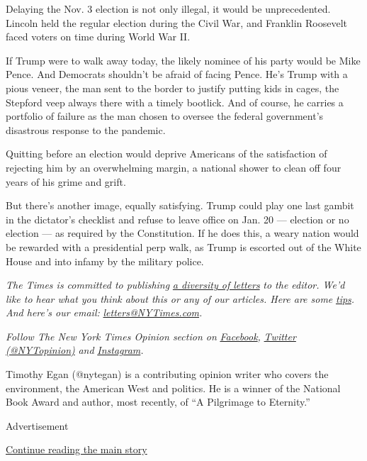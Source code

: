 Delaying the Nov. 3 election is not only illegal, it would be
unprecedented. Lincoln held the regular election during the Civil War,
and Franklin Roosevelt faced voters on time during World War II.

If Trump were to walk away today, the likely nominee of his party would
be Mike Pence. And Democrats shouldn't be afraid of facing Pence. He's
Trump with a pious veneer, the man sent to the border to justify putting
kids in cages, the Stepford veep always there with a timely bootlick.
And of course, he carries a portfolio of failure as the man chosen to
oversee the federal government's disastrous response to the pandemic.

Quitting before an election would deprive Americans of the satisfaction
of rejecting him by an overwhelming margin, a national shower to clean
off four years of his grime and grift.

But there's another image, equally satisfying. Trump could play one last
gambit in the dictator's checklist and refuse to leave office on Jan. 20
--- election or no election --- as required by the Constitution. If he
does this, a weary nation would be rewarded with a presidential perp
walk, as Trump is escorted out of the White House and into infamy by the
military police.

\emph{The Times is committed to publishing}
\href{https://www.nytimes3xbfgragh.onion/2019/01/31/opinion/letters/letters-to-editor-new-york-times-women.html}{\emph{a
diversity of letters}} \emph{to the editor. We'd like to hear what you
think about this or any of our articles. Here are some}
\href{https://help.nytimes3xbfgragh.onion/hc/en-us/articles/115014925288-How-to-submit-a-letter-to-the-editor}{\emph{tips}}\emph{.
And here's our email:}
\href{mailto:letters@NYTimes.com}{\emph{letters@NYTimes.com}}\emph{.}

\emph{Follow The New York Times Opinion section on}
\href{https://www.facebookcorewwwi.onion/nytopinion}{\emph{Facebook}}\emph{,}
\href{http://twitter.com/NYTOpinion}{\emph{Twitter (@NYTopinion)}}
\emph{and}
\href{https://www.instagram.com/nytopinion/}{\emph{Instagram}}\emph{.}

Timothy Egan (@nytegan) is a contributing opinion writer who covers the
environment, the American West and politics. He is a winner of the
National Book Award and author, most recently, of ``A Pilgrimage to
Eternity.''

Advertisement

\protect\hyperlink{after-bottom}{Continue reading the main story}

